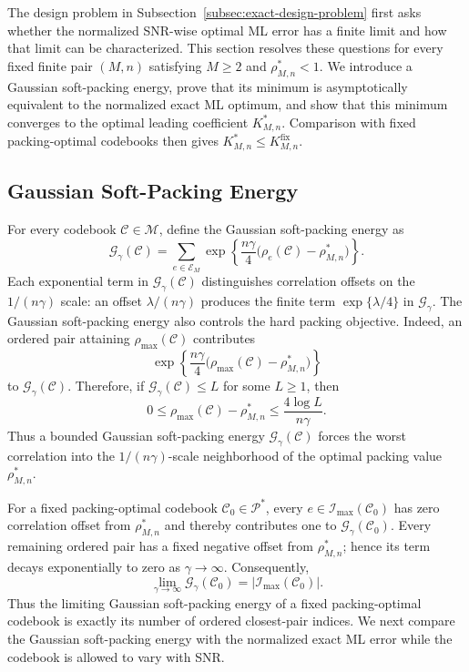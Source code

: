 \documentclass[12pt,draftclsnofoot,onecolumn]{IEEEtran}
\newcommand{\cC}{\mathcal{C}}
\newcommand{\cE}{\mathcal{E}}
\newcommand{\cG}{\mathcal{G}}
\newcommand{\cI}{\mathcal{I}}
\newcommand{\cM}{\mathcal{M}}
\newcommand{\cP}{\mathcal{P}}
\theoremstyle{definition}
\begin{document}
The design problem in Subsection~\ref{subsec:exact-design-problem} first
asks whether the normalized SNR-wise optimal ML error has a finite limit
and how that limit can be characterized.  This section resolves these
questions for every fixed finite pair \((M,n)\) satisfying
\(M\ge2\) and \(\rho^{\ast}_{M,n}<1\).  We introduce a Gaussian
soft-packing energy, prove that its minimum is asymptotically equivalent
to the normalized exact ML optimum, and show that this minimum converges
to the optimal leading coefficient \(K^{\ast}_{M,n}\).  Comparison with fixed
packing-optimal codebooks then gives
\(K^{\ast}_{M,n}\le K^{\mathrm{fix}}_{M,n}\).

\subsection{Gaussian Soft-Packing Energy}
\label{subsec:global-soft-packing-energy}

For every codebook \(\cC\in\cM\), define the Gaussian soft-packing energy as
\begin{equation}
  \cG_\gamma(\cC)
  =\sum_{e\in\cE_M}
  \exp\left\{\frac{n\gamma}{4}
  \bigl(\rho_e(\cC)-\rho^{\ast}_{M,n}\bigr)\right\}.
  \label{eq:global-soft-packing-energy}
\end{equation}
Each exponential term in \(\cG_\gamma(\cC)\) distinguishes correlation offsets on the
\(1/(n\gamma)\) scale: an offset \(\lambda/(n\gamma)\) produces the
finite term \(\exp\{\lambda/4\}\) in \(\cG_\gamma\).
The Gaussian soft-packing energy also controls the hard packing objective.  Indeed, an
ordered pair attaining \(\rho_{\max}(\cC)\) contributes
\begin{equation*}
  \exp\left\{\frac{n\gamma}{4}
  \bigl(\rho_{\max}(\cC)-\rho^{\ast}_{M,n}\bigr)\right\}
\end{equation*}
to \(\cG_\gamma(\cC)\).  Therefore, if
\(\cG_\gamma(\cC)\le L\) for some \(L\geq1\), then
\begin{equation}
  0\le \rho_{\max}(\cC)-\rho^{\ast}_{M,n}
  \le \frac{4\log L}{n\gamma}.
  \label{eq:bounded-energy-packing-consequence}
\end{equation}
Thus a bounded Gaussian soft-packing energy \(\cG_\gamma(\cC)\) forces the worst correlation into the
\(1/(n\gamma)\)-scale neighborhood of the optimal packing value \(\rho^{\ast}_{M,n}\).


For a fixed packing-optimal codebook \(\cC_0\in\cP^{\ast}\), every
\(e\in\cI_{\max}(\cC_0)\) has zero correlation offset from \(\rho^{\ast}_{M,n}\) and thereby contributes
one to \(\cG_\gamma(\cC_0)\).  Every remaining ordered pair has a fixed
negative offset from \(\rho^{\ast}_{M,n}\); hence its term decays
exponentially to zero as \(\gamma\to\infty\).  Consequently,
\begin{equation}
  \lim_{\gamma\to\infty}\cG_\gamma(\cC_0)
  =|\cI_{\max}(\cC_0)|.
  \label{eq:soft-packing-fixed-limit}
\end{equation}
Thus the limiting Gaussian soft-packing energy of a fixed packing-optimal codebook is
exactly its number of ordered closest-pair indices.
We next compare the Gaussian soft-packing energy with the normalized exact ML
error while the codebook is allowed to vary with SNR.
\end{document}
